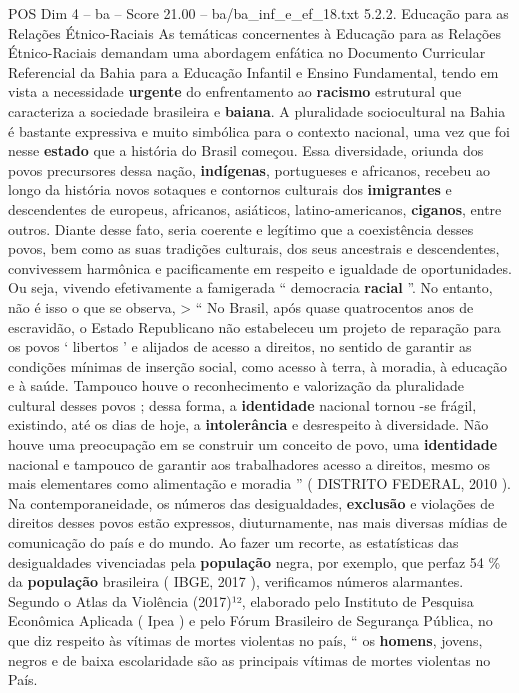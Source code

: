 \begin{textsample}{POS Dim 4 – ba – Score 21.00 – ba/ba\_inf\_e\_ef\_18.txt}  \label{ex:f4_pos_022}
5.2.2.
Educação para as Relações Étnico-Raciais As temáticas concernentes à Educação para as Relações Étnico-Raciais demandam uma abordagem enfática no Documento Curricular Referencial da Bahia para a Educação Infantil e Ensino Fundamental, tendo em vista a necessidade \textbf{urgente} do enfrentamento ao \textbf{racismo} estrutural que caracteriza a sociedade brasileira e \textbf{baiana}.
A pluralidade sociocultural na Bahia é bastante expressiva e muito simbólica para o contexto nacional, uma vez que foi nesse \textbf{estado} que a história do Brasil começou.
Essa diversidade, oriunda dos povos precursores dessa nação, \textbf{indígenas}, portugueses e africanos, recebeu ao longo da história novos sotaques e contornos culturais dos \textbf{imigrantes} e descendentes de europeus, africanos, asiáticos, latino-americanos, \textbf{ciganos}, entre outros.
Diante desse fato, seria coerente e legítimo que a coexistência desses povos, bem como as suas tradições culturais, dos seus ancestrais e descendentes, convivessem harmônica e pacificamente em respeito e igualdade de oportunidades.
Ou seja, vivendo efetivamente a famigerada “ democracia \textbf{racial} ”.
No entanto, não é isso o que se observa, > “ No Brasil, após quase quatrocentos anos de escravidão, o Estado Republicano não estabeleceu um projeto de reparação para os povos ‘ libertos ’ e alijados de acesso a direitos, no sentido de garantir as condições mínimas de inserção social, como acesso à terra, à moradia, à educação e à saúde.
Tampouco houve o reconhecimento e valorização da pluralidade cultural desses povos ; dessa forma, a \textbf{identidade} nacional tornou -se frágil, existindo, até os dias de hoje, a \textbf{intolerância} e desrespeito à diversidade.
Não houve uma preocupação em se construir um conceito de povo, uma \textbf{identidade} nacional e tampouco de garantir aos trabalhadores acesso a direitos, mesmo os mais elementares como alimentação e moradia ” ( DISTRITO FEDERAL, 2010 ).
Na contemporaneidade, os números das desigualdades, \textbf{exclusão} e violações de direitos desses povos estão expressos, diuturnamente, nas mais diversas mídias de comunicação do país e do mundo.
Ao fazer um recorte, as estatísticas das desigualdades vivenciadas pela \textbf{população} negra, por exemplo, que perfaz 54 \% da \textbf{população} brasileira ( IBGE, 2017 ), verificamos números alarmantes.
Segundo o Atlas da Violência (2017)¹², elaborado pelo Instituto de Pesquisa Econômica Aplicada ( Ipea ) e pelo Fórum Brasileiro de Segurança Pública, no que diz respeito às vítimas de mortes violentas no país, “ os \textbf{homens}, jovens, negros e de baixa escolaridade são as principais vítimas de mortes violentas no País.

\end{textsample}
